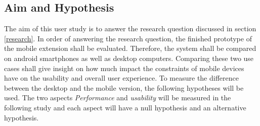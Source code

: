 \subsection{Aim and Hypothesis}
\label{aim}
The aim of this user study is to answer the research question discussed in section \ref{research}.
In order of answering the research question, the finished prototype of the mobile extension shall be evaluated.
Therefore, the system shall be compared on \gls{android} smartphones as well as desktop computers.
Comparing these two use cases shall give insight on how much impact the constraints of mobile devices have on the \gls{usability} and overall user experience.
To measure the difference between the desktop and the mobile version, the following hypotheses will be used.
The two aspects \textit{Performance} and \textit{\gls{usability}} will be measured in the following study and each aspect will have a null hypothesis and an alternative hypothesis.
